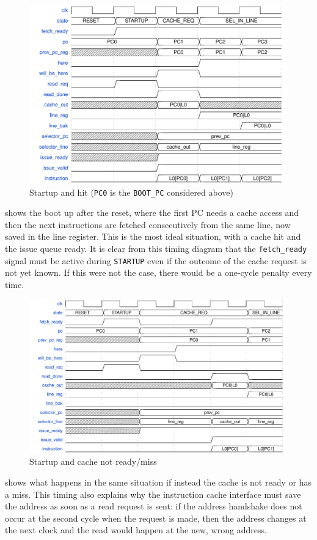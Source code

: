 \begin{figure}[hbt]
  \centering
  \includegraphics[scale=.6]{img/fetch01.pdf}
  \caption[Startup and hit]{Startup and hit (\texttt{PC0} is the \texttt{BOOT\_PC} considered above)}
  \label{fig:fetch01}
\end{figure}
 shows the boot up after the reset, where the first \ac{PC} needs a cache access and then the next instructions are fetched consecutively from the same line, now saved in the line register. This is the most ideal situation, with a cache hit and the issue queue ready. It is clear from this timing diagram that the \texttt{fetch\_ready} signal must be active during \texttt{STARTUP} even if the outcome of the cache request is not yet known. If this were not the case, there would be a one-cycle penalty every time.

\begin{figure}[!h]
  \centering
  \includegraphics[scale=.6]{img/fetch02.pdf}
  \caption{Startup and cache not ready/miss}
  \label{fig:fetch02}
\end{figure}
 shows what happens in the same situation if instead the cache is not ready or has a miss. This timing also explains why the instruction cache interface must save the address as soon as a read request is sent: if the address handshake does not occur at the second cycle when the request is made, then the address changes at the next clock and the read would happen at the new, wrong address.

